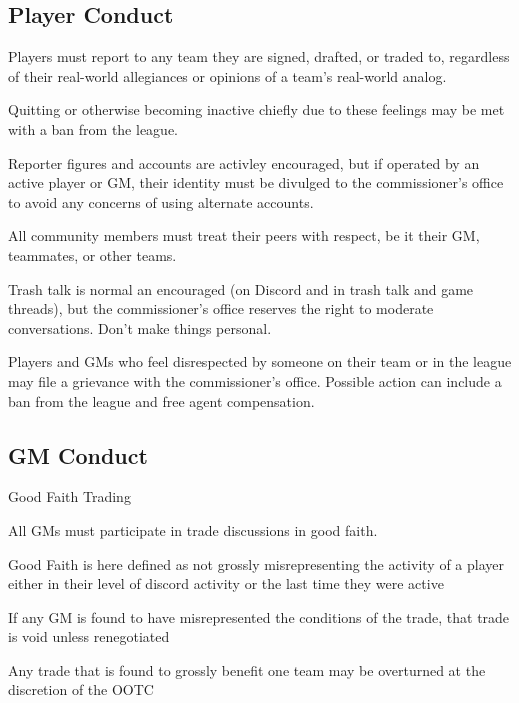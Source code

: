 \subsection{Player Conduct}
\begin{deepEnumerate}
	\item Players must report to any team they are signed, drafted, or traded to,
	regardless of their real-world allegiances or opinions of a team's real-world analog.
	\begin{deepEnumerate}
		\item Quitting or otherwise becoming inactive 
		chiefly due to these feelings
		may be met with a ban from the league.
	\end{deepEnumerate}
	\item Reporter figures and accounts are activley encouraged,
	\label{sec:reporters}
	but if operated by an active player or GM,
	their identity must be divulged to the commissioner’s office
	to avoid any concerns of using alternate accounts.
	\item All community members must treat their peers with respect,
	be it their GM, teammates, or other teams.
	\begin{deepEnumerate}
		\item Trash talk is normal an encouraged
		(on Discord and in trash talk and game threads),
		but the commissioner’s office reserves the right to moderate conversations.
		Don't make things personal.
		\item Players and GMs who feel disrespected by someone on their team or in the league 
		may file a grievance with the commissioner’s office.
		Possible action can include a ban from the league and free agent compensation.
	\end{deepEnumerate}
\end{deepEnumerate}

\subsection{GM Conduct}
\begin{deepEnumerate}
	\item Good Faith Trading
	\begin{deepEnumerate}
		\item All GMs must participate in trade discussions in good faith.
			\begin{deepEnumerate}
			\item Good Faith is here defined as not grossly misrepresenting the activity of a player either in their level of discord activity or the last time they were active
			\end{deepEnumerate}
		\item If any GM is found to have misrepresented the conditions of the trade, that trade is void unless renegotiated
		\item Any trade that is found to grossly benefit one team may be overturned at the discretion of the OOTC 
	\end{deepEnumerate}
\end{deepEnumerate}

